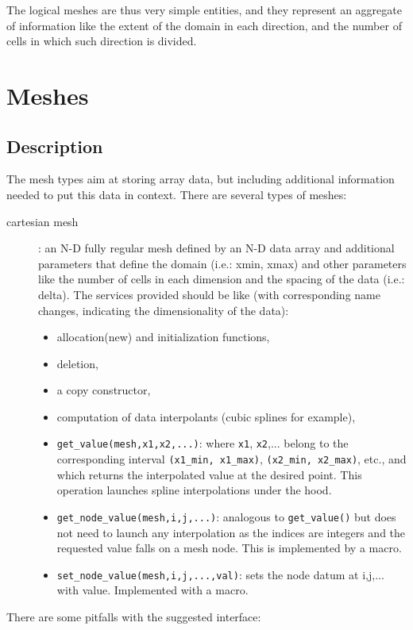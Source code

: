 \documentclass[]{report}   %
\begin{document}
   The logical meshes are thus very simple entities, and they represent an aggregate of information like the extent of the domain in each direction, and the number of cells in which such direction is divided.







\section{Meshes}
\subsection{Description}
The mesh types aim at storing array data, but including additional information needed to put this data in context. There are several types of meshes:
\begin{description}
\item[cartesian mesh]: an N-D fully regular mesh defined by an N-D data array and additional parameters that define the domain (i.e.: xmin, xmax) and other parameters like the number of cells in each dimension and the spacing of the data (i.e.: delta). The services provided should be like (with corresponding name changes, indicating the dimensionality of the data):
\begin{itemize}
\item allocation(new) and initialization functions,
\item deletion,
\item a copy constructor,
\item computation of data interpolants (cubic splines for example),
\item \verb+get_value(mesh,x1,x2,...)+: where \verb+x1+, \verb+x2+,... belong to the corresponding interval \verb+(x1_min, x1_max)+, \verb+(x2_min, x2_max)+, etc., and which returns the interpolated value at the desired point. This operation launches spline interpolations under the hood.
\item \verb+get_node_value(mesh,i,j,...)+: analogous to \verb+get_value()+ but does not need to launch any interpolation as the indices are integers and the requested value falls on a mesh node. This is implemented by a macro.
\item \verb+set_node_value(mesh,i,j,...,val)+: sets the node datum at i,j,... with value. Implemented with a macro.
\end{itemize}
\end{description}
There are some pitfalls with the suggested interface:
\end{document}
